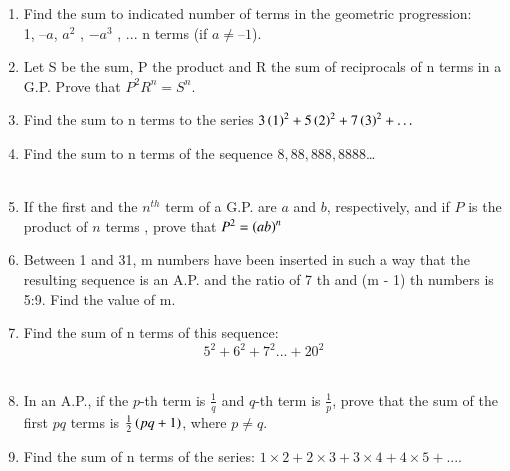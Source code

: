 \begin{enumerate}[label=\thesection.\arabic*,ref=\thesection.\theenumi]
\item Find the sum to indicated number of terms in the geometric progression:\\
1, $– a$, $a^2$
, $-a^3$
, ... n terms (if $a \neq – 1$).\\
\solution
\pagebreak

\item Let S be the sum, P the product and R the sum of reciprocals of n terms in a G.P.
Prove that $P^2 R^n = S^n$.\\
\solution
\pagebreak
\item Find the sum to n terms to the series $3\left(1\right)^2+5\left(2\right)^2+7\left(3\right)^2+ \ldots$\\
\solution

\pagebreak
\item Find the sum to n terms of the sequence $8,88,888,8888$\ldots\\
\solution\\

\pagebreak

\item If the first and the  $n^{th}$  term of a G.P. are $a$ and $b$, respectively, and if $P$ is the product of $n$ terms , prove that $ P^2 = \left(ab\right)^n $ \\
\solution

\pagebreak

\item Between 1 and 31, m numbers have been inserted in such a way that the resulting sequence is an A.P. and 
the ratio of 7 th and (m - 1) th numbers is 5:9. Find the value of m.\\
\solution

\pagebreak
\item Find the sum of n terms of this sequence:$$5^2+6^2+7^2...+20^2$$  \\
\solution

\pagebreak

\item In an A.P., if the $p$-th term is $\frac{1}{q}$ and $q$-th term is $\frac{1}{p}$, prove that the sum of the first $pq$ terms is $\frac{1}{2}\left(pq + 1\right)$, where $p \neq q$.\\
\solution

\pagebreak
\item Find the sum of n terms of the series:
$1\times2+2\times3+3\times4+4\times5+....$\\
\solution

\pagebreak

\end{enumerate}
